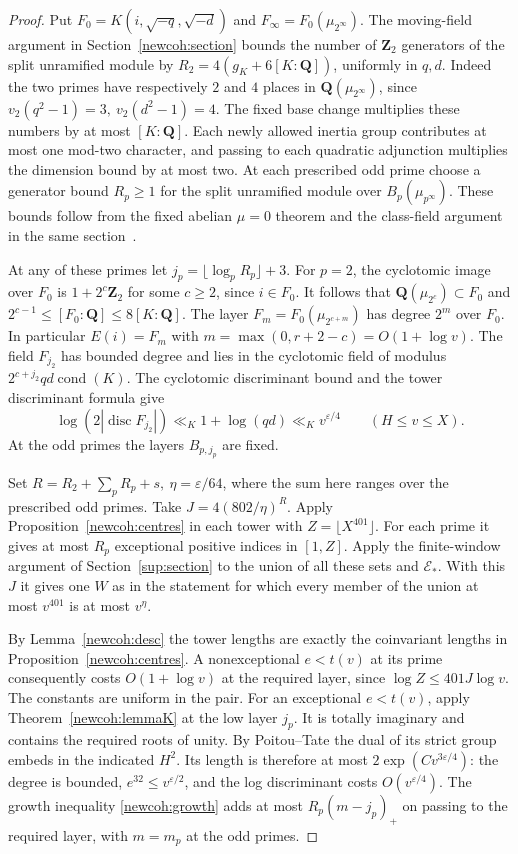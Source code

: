 \begin{proof}
Put \(F_0=K(i,\sqrt{-q},\sqrt{-d})\) and
\(F_\infty=F_0(\mu_{2^\infty})\). The moving-field argument in
Section~\ref{newcoh:section} bounds the number of \(\mathbf Z_2\)
generators of the split unramified module by
\(R_2=4(g_K+6[K:\mathbf Q])\), uniformly in \(q,d\).
Indeed the two primes have respectively \(2\) and \(4\) places in
\(\mathbf Q(\mu_{2^\infty})\), since
\(v_2(q^2-1)=3,\ v_2(d^2-1)=4\).
The fixed base change multiplies these numbers by at most
\([K:\mathbf Q]\). Each newly allowed inertia group contributes
at most one mod-two character, and passing to each quadratic
adjunction multiplies the dimension bound by at most two.
At each prescribed odd prime choose a generator bound \(R_p\ge1\)
for the split unramified module over \(B_p(\mu_{p^\infty})\).
These bounds follow from the fixed abelian \(\mu=0\) theorem and the
class-field argument in the same section~\cite{ferreroWashington}.

At any of these primes let \(j_p=\lfloor\log_p R_p\rfloor+3\).
For \(p=2\), the cyclotomic image over \(F_0\) is
\(1+2^c\mathbf Z_2\) for some \(c\ge2\), since \(i\in F_0\).
It follows that \(\mathbf Q(\mu_{2^c})\subset F_0\) and
\(2^{c-1}\le[F_0:\mathbf Q]\le8[K:\mathbf Q]\).
The layer \(F_m=F_0(\mu_{2^{c+m}})\) has degree \(2^m\) over \(F_0\).
In particular \(E(i)=F_m\) with \(m=\max(0,r+2-c)=O(1+\log v)\).
The field \(F_{j_2}\) has bounded degree and lies in the cyclotomic
field of modulus \(2^{c+j_2}qd\operatorname{cond}(K)\). The
cyclotomic discriminant bound and the tower discriminant formula give
\[
 \log(2|\operatorname{disc}F_{j_2}|)\ll_K 1+\log(qd)\ll_K v^{\varepsilon/4}
 \qquad(H\le v\le X).
\]
At the odd primes the layers \(B_{p,j_p}\) are fixed.

Set \(R=R_2+\sum_p R_p+s,\ \eta=\varepsilon/64\), where the sum
here ranges over the prescribed odd primes. Take \(J=4(802/\eta)^R\).
Apply Proposition~\ref{newcoh:centres} in each tower with
\(Z=\lfloor X^{401}\rfloor\). For each prime it gives at most \(R_p\)
exceptional positive indices in \([1,Z]\). Apply the finite-window
argument of Section~\ref{sup:section} to the union of all these
sets and \(\mathcal E_*\). With this \(J\) it gives one \(W\) as in
the statement for which every member of the union at most \(v^{401}\)
is at most \(v^\eta\).

By Lemma~\ref{newcoh:desc} the tower lengths are exactly the
coinvariant lengths in Proposition~\ref{newcoh:centres}.
A nonexceptional \(e<t(v)\) at its prime consequently costs
\(O(1+\log v)\) at the required layer, since
\(\log Z\le401J\log v\). The constants are uniform in the pair.
For an exceptional \(e<t(v)\), apply Theorem~\ref{newcoh:lemmaK}
at the low layer \(j_p\). It is totally imaginary and contains the
required roots of unity. By Poitou--Tate the dual of its strict
group embeds in the indicated \(H^2\). Its length is therefore at
most \(2\exp(Cv^{3\varepsilon/4})\): the degree is bounded,
\(e^{32}\le v^{\varepsilon/2}\), and the log discriminant costs
\(O(v^{\varepsilon/4})\). The growth inequality
\eqref{newcoh:growth} adds at most \(R_p(m-j_p)_+\) on passing to
the required layer, with \(m=m_p\) at the odd primes.


\end{proof}
